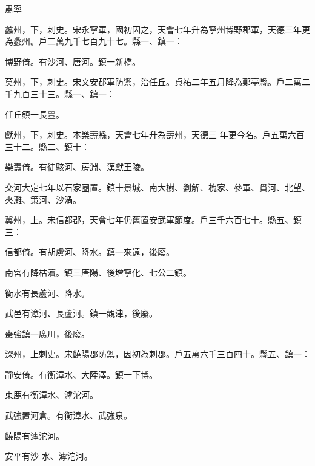 \begin{pinyinscope}
 肅寧



 蠡州，下，刺史。宋永寧軍，國初因之，天會七年升為寧州博野郡軍，天德三年更為蠡州。戶二萬九千七百九十七。縣一、鎮一：



 博野倚。有沙河、唐河。鎮一新橋。



 莫州，下，刺史。宋文安郡軍防禦，治任丘。貞祐二年五月降為鄚亭縣。戶二萬二千九百三十三。縣一、鎮一：



 任丘鎮一長豐。



 獻州，下，刺史。本樂壽縣，天會七年升為壽州，天德三
 年更今名。戶五萬六百三十二。縣二、鎮十：



 樂壽倚。有徒駭河、房淵、漢獻王陵。



 交河大定七年以石家圈置。鎮十景城、南大樹、劉解、槐家、參軍、貫河、北望、夾灘、策河、沙渦。



 冀州，上。宋信都郡，天會七年仍舊置安武軍節度。戶三千六百七十。縣五、鎮三：



 信都倚。有胡盧河、降水。鎮一來遠，後廢。



 南宮有降枯瀆。鎮三唐陽、後增寧化、七公二鎮。



 衡水有長蘆河、降水。



 武邑有漳河、長蘆河。鎮一觀津，後廢。



 棗強鎮一廣川，後廢。



 深州，上刺史。宋饒陽郡防禦，因初為刺郡。戶五萬六千三百四十。縣五、鎮一：



 靜安倚。有衡漳水、大陸澤。鎮一下博。



 束鹿有衡漳水、滹沱河。



 武強置河倉。有衡漳水、武強泉。



 饒陽有滹沱河。



 安平有沙
 水、滹沱河。




\end{pinyinscope}
